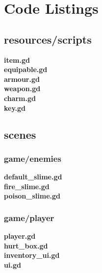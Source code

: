 \documentclass{article}
\begin{document}
\section{Code Listings}
\subsection{resources/scripts}
\textbf{item.gd}\\

\textbf{equipable.gd}\\

\textbf{armour.gd}\\

\textbf{weapon.gd}\\

\textbf{charm.gd}\\

\newpage
\textbf{key.gd}\\

\subsection{scenes}
\subsubsection{game/enemies}
\textbf{default\_slime.gd}\\

\textbf{fire\_slime.gd}\\

\textbf{poison\_slime.gd}\\

\subsubsection{game/player}
\textbf{player.gd}\\

\textbf{hurt\_box.gd}\\

\textbf{inventory\_ui.gd}\\

\textbf{ui.gd}\\

\end{document}

